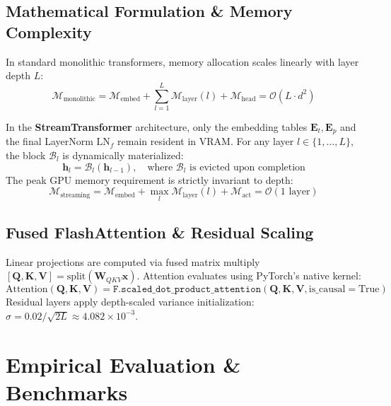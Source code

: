 \documentclass[10pt,twocolumn,a4paper]{article}
\begin{document}
\subsection{Mathematical Formulation & Memory Complexity}
In standard monolithic transformers, memory allocation scales linearly with layer depth $L$:
\begin{equation}
    \mathcal{M}_{\text{monolithic}} = \mathcal{M}_{\text{embed}} + \sum_{l=1}^L \mathcal{M}_{\text{layer}}(l) + \mathcal{M}_{\text{head}} = \mathcal{O}(L \cdot d^2)
\end{equation}

In the \textbf{StreamTransformer} architecture, only the embedding tables $\mathbf{E}_t, \mathbf{E}_p$ and the final LayerNorm $\text{LN}_f$ remain resident in VRAM. For any layer $l \in \{1, \dots, L\}$, the block $\mathcal{B}_l$ is dynamically materialized:
\begin{equation}
    \mathbf{h}_l = \mathcal{B}_l(\mathbf{h}_{l-1}), \quad \text{where } \mathcal{B}_l \text{ is evicted upon completion}
\end{equation}
The peak GPU memory requirement is strictly invariant to depth:
\begin{equation}
    \mathcal{M}_{\text{streaming}} = \mathcal{M}_{\text{embed}} + \max_{l} \mathcal{M}_{\text{layer}}(l) + \mathcal{M}_{\text{act}} = \mathcal{O}(1 \text{ layer})
\end{equation}

\subsection{Fused FlashAttention & Residual Scaling}
Linear projections are computed via fused matrix multiply $[\mathbf{Q}, \mathbf{K}, \mathbf{V}] = \text{split}(\mathbf{W}_{QKV} \mathbf{x})$. Attention evaluates using PyTorch's native kernel:
\begin{equation}
    \text{Attention}(\mathbf{Q}, \mathbf{K}, \mathbf{V}) = \texttt{F.scaled\_dot\_product\_attention}(\mathbf{Q}, \mathbf{K}, \mathbf{V}, \text{is\_causal}=\text{True})
\end{equation}
Residual layers apply depth-scaled variance initialization: $\sigma = 0.02 / \sqrt{2L} \approx 4.082 \times 10^{-3}$.

\section{Empirical Evaluation & Benchmarks}
\label{sec:experiments}
\end{document}
